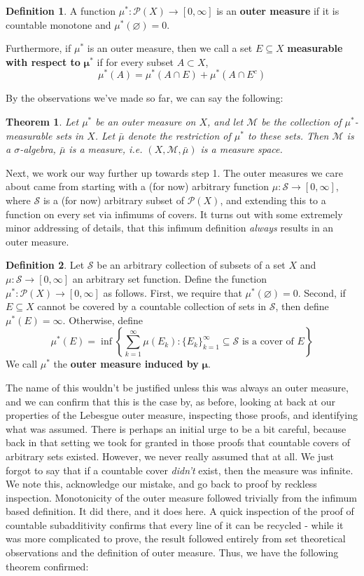 \documentclass{article}
\theoremstyle{definition}
\newtheorem{definition}{Definition}[section]
\theoremstyle{plain}
\theoremstyle{theorem}
\newtheorem{theorem}{Theorem}[section]
\begin{document}
\begin{definition}
	A function $\mu^*:\mathcal{P}(X) \to [0,\infty]$ is an \textbf{outer measure} if it is countable monotone and $\mu^*(\varnothing) = 0$. \par
	Furthermore, if $\mu^*$ is an outer measure, then we call a set $E \subseteq X$ \textbf{measurable with respect to} $\bm{\mu^*}$ if for every subset $A \subset X$, 
	\[ \mu^*(A) = \mu^*(A \cap E) + \mu^*(A \cap E^c) \]
\end{definition}
By the observations we've made so far, we can say the following:
\begin{theorem}
	Let $\mu^*$ be an outer measure on $X$, and let $\mathcal{M}$ be the collection of $\mu^*$-measurable sets in $X$. Let $\bar{\mu}$ denote the restriction of $\mu^*$ to these sets. Then $\mathcal{M}$ is a $\sigma$-algebra, $\bar{\mu}$ is a measure, i.e. $(X,\mathcal{M},\bar{\mu})$ is a measure space.
\end{theorem}
Next, we work our way further up towards step 1. The outer measures we care about came from starting with a (for now) arbitrary function $\mu:\mathcal{S} \to [0,\infty]$, where $\mathcal{S}$ is a (for now) arbitrary subset of $\mathcal{P}(X)$, and extending this to a function on every set via infimums of covers. It turns out with some extremely minor addressing of details, that this infimum definition \textit{always} results in an outer measure. 
\begin{definition}
	Let $\mathcal{S}$ be an arbitrary collection of subsets of a set $X$ and $\mu:\mathcal{S} \to [0,\infty]$ an arbitrary set function. Define the function $\mu^*:\mathcal{P}(X) \to [0,\infty]$ as follows. First, we require that $\mu^*(\varnothing) = 0$. Second, if $E \subseteq X$ cannot be covered by a countable collection of sets in $\mathcal{S}$, then define $\mu^*(E) = \infty$. Otherwise, define 
	\[ \mu^*(E) = \inf \left\{\sum_{k=1}^{\infty} \mu(E_k): \{E_k\}_{k =1}^{\infty} \subseteq \mathcal{S} \textrm{ is a cover of $E$}  \right\} \]
	We call $\mu^*$ the \textbf{outer measure induced by} $\bm{\mu}$. 
\end{definition} 
The name of this wouldn't be justified unless this was always an outer measure, and we can confirm that this is the case by, as before, looking at back at our properties of the Lebesgue outer measure, inspecting those proofs, and identifying what was assumed. There is perhaps an initial urge to be a bit careful, because back in that setting we took for granted in those proofs that countable covers of arbitrary sets existed. However, we never really assumed that at all. We just forgot to say that if a countable cover \textit{didn't} exist, then the measure was infinite. We note this, acknowledge our mistake, and go back to proof by reckless inspection. Monotonicity of the outer measure followed trivially from the infimum based definition. It did there, and it does here. A quick inspection of the proof of countable subadditivity confirms that every line of it can be recycled - while it was more complicated to prove, the result followed entirely from set theoretical observations and the definition of outer measure. Thus, we have the following theorem confirmed:
\end{document}
